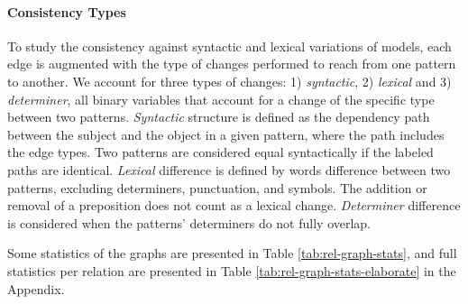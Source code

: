 


\paragraph{Consistency Types}
To study the consistency against syntactic and lexical variations of models, each edge is augmented with the type of changes performed to reach from one pattern to another. We account for three types of changes: 1) \textit{syntactic}, 2) \textit{lexical} and 3) \textit{determiner}, all binary variables that account for a change of the specific type between two patterns.
\textit{Syntactic} structure is defined as the dependency path between the subject and the object in a given pattern, where the path includes the edge types. Two patterns are considered equal syntactically if the labeled paths are identical.
\textit{Lexical} difference is defined by words difference between two patterns, excluding determiners, punctuation, and symbols. The addition or removal of a preposition does not count as a lexical change.
\textit{Determiner} difference is considered when the patterns' determiners do not fully overlap.


Some statistics of the graphs are presented in Table \ref{tab:rel-graph-stats}, and full statistics per relation are presented in Table \ref{tab:rel-graph-stats-elaborate} in the Appendix.



% 

